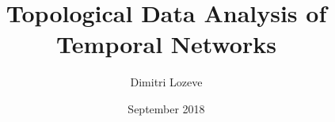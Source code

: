 \abstractintoc%
\renewcommand{\abstractnamefont}{\normalfont\large\scshape}
\renewcommand{\abstracttextfont}{\normalfont\normalsize}

\setlength{\epigraphwidth}{0.5\textwidth}


\author{Dimitri Lozeve}
\date{September 2018}
\title{Topological Data Analysis of Temporal Networks}







